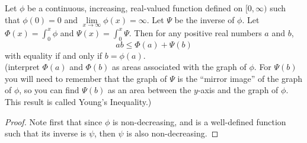 \begin{pblm} \label{p:129} %
	Let $\phi$ be a continuous, increasing, real-valued function defined on $[0,\infty)$ 
	such that $\phi(0) = 0$ and $\lim\limits_{x\to\infty}\phi(x) = \infty$. Let 
	$\varPsi$ be the inverse of $\phi$. Let 
	$\Phi(x) = \int_0^x\phi$ and $\Psi(x) = \int_0^x\varPsi$. Then for any positive real 
	numbers $a$ and $b$, 
	\begin{equation*}
		ab \le \Phi(a) + \Psi(b)
	\end{equation*}
	with equality if and only if $b = \phi(a)$. \\
	{\scriptsize{(interpret $\Phi(a)$ and $\Phi(b)$ as areas associated with the graph of 
	$\phi$. For $\Psi(b)$ you will need to remember that the graph of $\varPsi$ is the 
	``mirror image'' of the graph of $\phi$, so you can find $\Psi(b)$ as an area between 
	the $y$-axis and the graph of $\phi$. This result is called Young's Inequality.)}}
\pagebreak
\begin{proof}
	Note first that since $\phi$ is non-decreasing, and is a well-defined function such 
	that its inverse is $\psi$, then $\psi$ is also non-decreasing. 


\end{proof}
\end{pblm}
